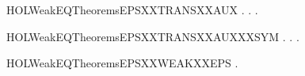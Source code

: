 \newcommand{\HOLWeakEQTheoremsEPSXXTRANS}{\UseVerbatim{HOLWeakEQTheoremsEPSXXTRANS}}
\begin{SaveVerbatim}{HOLWeakEQTheoremsEPSXXTRANSXXAUX}
\HOLTokenTurnstile{} \HOLSymConst{\HOLTokenForall{}} .
          \HOLSymConst{\HOLTokenImp{}}
       \HOLSymConst{\HOLTokenForall{}} .
             \HOLSymConst{\HOLTokenConj{}}    \HOLSymConst{\HOLTokenImp{}}
           \HOLSymConst{\HOLTokenExists{}}.    \HOLSymConst{\HOLTokenConj{}}   
\end{SaveVerbatim}
\newcommand{\HOLWeakEQTheoremsEPSXXTRANSXXAUX}{\UseVerbatim{HOLWeakEQTheoremsEPSXXTRANSXXAUX}}
\begin{SaveVerbatim}{HOLWeakEQTheoremsEPSXXTRANSXXAUXXXSYM}
\HOLTokenTurnstile{} \HOLSymConst{\HOLTokenForall{}} .
          \HOLSymConst{\HOLTokenImp{}}
       \HOLSymConst{\HOLTokenForall{}} .
             \HOLSymConst{\HOLTokenConj{}}    \HOLSymConst{\HOLTokenImp{}}
           \HOLSymConst{\HOLTokenExists{}}.    \HOLSymConst{\HOLTokenConj{}}   
\end{SaveVerbatim}
\newcommand{\HOLWeakEQTheoremsEPSXXTRANSXXAUXXXSYM}{\UseVerbatim{HOLWeakEQTheoremsEPSXXTRANSXXAUXXXSYM}}
\begin{SaveVerbatim}{HOLWeakEQTheoremsEPSXXWEAKXXEPS}
\HOLTokenTurnstile{} \HOLSymConst{\HOLTokenForall{}}    .    \HOLSymConst{\HOLTokenConj{}}  \HOLTokenWeakTransBegin{}\HOLTokenWeakTransEnd {} \HOLSymConst{\HOLTokenConj{}}    \HOLSymConst{\HOLTokenImp{}}  \HOLTokenWeakTransBegin{}\HOLTokenWeakTransEnd {}
\end{SaveVerbatim}
